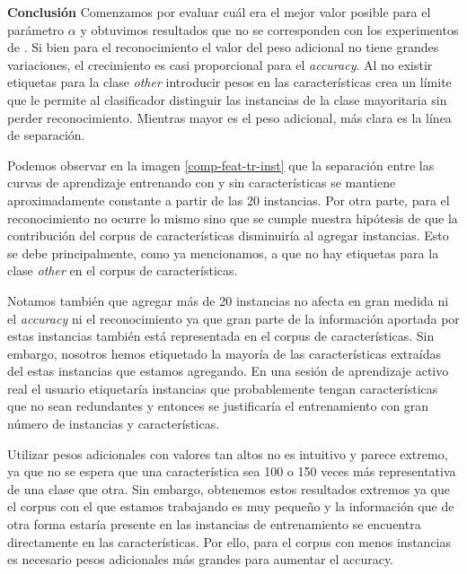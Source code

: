 \textbf{Conclusión}
Comenzamos por evaluar cuál era el mejor valor posible para el parámetro $\alpha$ y obtuvimos resultados que no se corresponden con los experimentos de \citet{dualist}. Si bien para el reconocimiento el valor del peso adicional no tiene grandes variaciones, el crecimiento es casi proporcional para el \textit{accuracy}. Al no existir etiquetas para la clase \textit{other} introducir pesos en las características crea un límite que le permite al clasificador distinguir las instancias de la clase mayoritaria sin perder reconocimiento. Mientras mayor es el peso adicional, más clara es la línea de separación.

Podemos observar en la imagen \ref{comp-feat-tr-inst} que la separación entre las curvas de aprendizaje entrenando con y sin características se mantiene aproximadamente constante a partir de las 20 instancias. Por otra parte, para el reconocimiento no ocurre lo mismo sino que se cumple nuestra hipótesis de que la contribución del corpus de características disminuiría al agregar instancias. Esto se debe principalmente, como ya mencionamos, a que no hay etiquetas para la clase \textit{other} en el corpus de características.

Notamos también que agregar más de 20 instancias no afecta en gran medida ni el \textit{accuracy} ni el reconocimiento ya que gran parte de la información aportada por estas instancias también está representada en el corpus de características. Sin embargo, nosotros hemos etiquetado la mayoría de las características extraídas del estas instancias que estamos agregando. En una sesión de aprendizaje activo real el usuario etiquetaría instancias que probablemente tengan características que no sean redundantes y entonces se justificaría el entrenamiento con gran número de instancias y características.

Utilizar pesos adicionales con valores tan altos no es intuitivo y parece extremo, ya que no se espera que una característica sea 100 o 150 veces más representativa de una clase que otra. Sin embargo, obtenemos estos resultados extremos ya que el corpus con el que estamos trabajando es muy pequeño y la información que de otra forma estaría presente en las instancias de entrenamiento se encuentra directamente en las características. Por ello, para el corpus con menos instancias es necesario pesos adicionales más grandes para aumentar el accuracy.


